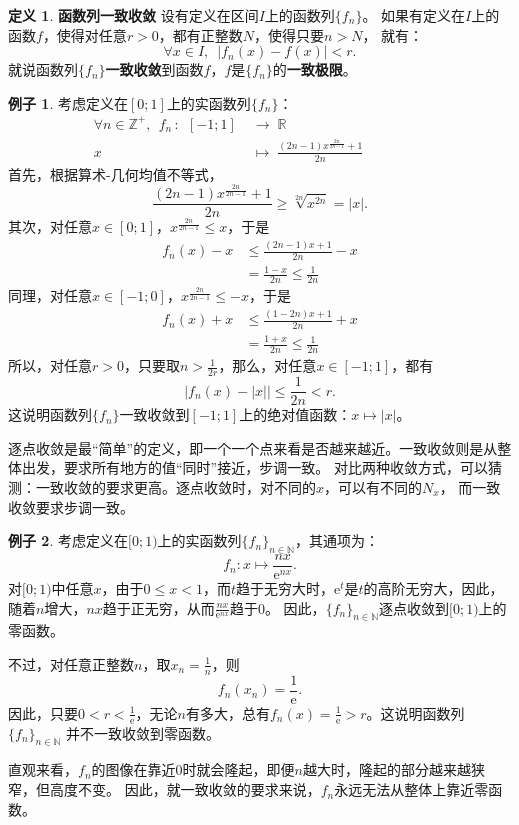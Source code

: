 \documentclass[12pt,UTF8]{ctexbook}
\newcommand{\e}{\mathrm{e}}
\theoremstyle{definition}
\newtheorem{df}{定义}[section]
\newtheorem{ex}{例子}[section]
\theoremstyle{plain}
\begin{document}
\begin{df}{\textbf{函数列一致收敛}}
    设有定义在区间$I$上的函数列$\{f_n\}$。
    如果有定义在$I$上的函数$f$，使得对任意$r>0$，都有正整数$N$，使得只要$n>N$，
    就有：
    $$ \forall x\in I, \,\,\,|f_n(x) - f(x) | < r.$$
    就说函数列$\{f_n\}$\textbf{一致收敛}到函数$f$，$f$是$\{f_n\}$的\textbf{一致极限}。
\end{df}

\begin{ex}
    考虑定义在$[0;1]$上的实函数列$\{f_n\}$：
    \begin{align*}
        \forall n\in \mathbb{Z}^+, \;\, f_n \,: \,\; [-1;1]\; &\rightarrow \; \mathbb{R} \\
        x \;&\mapsto \; \frac{(2n-1)x^{\frac{2n}{2n-1}} + 1}{2n} \qquad\qquad\phantom{9} 
    \end{align*}
    首先，根据算术-几何均值不等式，
    $$\frac{(2n-1)x^{\frac{2n}{2n-1}} + 1}{2n} \geqslant \sqrt[2n]{x^{2n}} = |x|.$$
    其次，对任意$x\in [0;1]$，$x^{\frac{2n}{2n-1}} \leqslant x$，于是
    \begin{align*}
        f_n(x) - x &\leqslant \frac{(2n-1)x + 1}{2n} - x \\
        &= \frac{1 - x}{2n} \leqslant \frac{1}{2n}
    \end{align*}
    同理，对任意$x\in [-1;0]$，$x^{\frac{2n}{2n-1}} \leqslant -x$，于是
    \begin{align*}
        f_n(x) + x &\leqslant \frac{(1 - 2n)x + 1}{2n} + x \\
        &= \frac{1 + x}{2n} \leqslant \frac{1}{2n}
    \end{align*}
    所以，对任意$r>0$，只要取$n> \frac{1}{2r}$，那么，对任意$x\in [-1;1]$，都有
    $$\Big|f_n(x) - |x|\Big| \leqslant \frac{1}{2n} < r. $$
    这说明函数列$\{f_n\}$一致收敛到$[-1;1]$上的绝对值函数：$x\mapsto |x|$。
\end{ex}

逐点收敛是最“简单”的定义，即一个一个点来看是否越来越近。一致收敛则是从整体出发，要求所有地方的值“同时”接近，步调一致。
对比两种收敛方式，可以猜测：一致收敛的要求更高。逐点收敛时，对不同的$x$，可以有不同的$N_x$，
而一致收敛要求步调一致。

\begin{ex}
    考虑定义在$[0;1)$上的实函数列$\{f_n\}_{n\in\mathbb{N}}$，其通项为：
    $$ f_n: x \mapsto \frac{nx}{\mathrm{e}^{nx}}. $$
    对$[0;1)$中任意$x$，由于$0\leqslant x<1$，而$t$趋于无穷大时，$\mathrm{e}^t$是$t$的高阶无穷大，因此，随着$n$增大，$nx$趋于正无穷，从而$\frac{nx}{\mathrm{e}^{nx}}$趋于$0$。
    因此，$\{f_n\}_{n\in\mathbb{N}}$逐点收敛到$[0;1)$上的零函数。

    不过，对任意正整数$n$，取$x_n = \frac{1}{n}$，则
    $$f_n(x_n) = \frac{1}{\e}.$$
    因此，只要$0<r <\frac{1}{\e}$，无论$n$有多大，总有$f_n(x) = \frac{1}{\e} > r$。这说明函数列$\{f_n\}_{n\in\mathbb{N}}$
    并不一致收敛到零函数。
    
    直观来看，$f_n$的图像在靠近$0$时就会隆起，即便$n$越大时，隆起的部分越来越狭窄，但高度不变。
    因此，就一致收敛的要求来说，$f_n$永远无法从整体上靠近零函数。

\end{ex}
\end{document}
